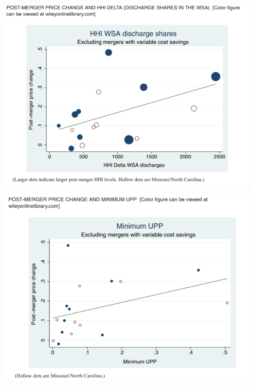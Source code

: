 \documentclass{beamer}
\begin{document}
\begin{frame}
            \includegraphics[width=\linewidth,height=\textheight,keepaspectratio]{hhi2.PNG} \\
    
\end{frame}
\begin{frame}
            \includegraphics[width=\linewidth,height=\textheight,keepaspectratio]{upp.PNG} \\
    
\end{frame}
\end{document}
